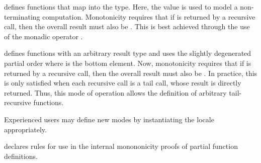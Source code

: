 \begin{isabellebody}
\begin{isamarkuptext}
\begin{description}
  \begin{description}

  \item {} defines functions that map into the  type. Here, the value  is used to model a
  non-terminating computation. Monotonicity requires that if  is returned by a recursive call, then the overall result must
  also be . This is best achieved through the use of the
  monadic operator .

  \item {} defines functions with an arbitrary result
  type and uses the slightly degenerated partial order where  is the bottom element.  Now, monotonicity requires that
  if  is returned by a recursive call, then the
  overall result must also be . In practice, this is
  only satisfied when each recursive call is a tail call, whose result
  is directly returned. Thus, this mode of operation allows the
  definition of arbitrary tail-recursive functions.

  \end{description}

  Experienced users may define new modes by instantiating the locale
   appropriately.

  \item \hyperlink{attribute.HOL.partial-function-mono}{\mbox{}} declares rules for
  use in the internal monononicity proofs of partial function
  definitions.


\end{description}
\end{isamarkuptext}
\end{isabellebody}
